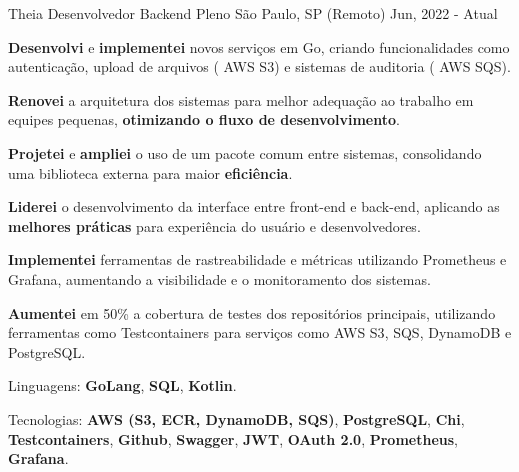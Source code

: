 \begin{cventries}
  \cventry
  {Theia} %
  {Desenvolvedor Backend Pleno} %
  {São Paulo, SP (Remoto)} %
  {Jun, 2022 - Atual} %
  {
    \begin{cvitems}
      \item {\textbf{Desenvolvi} e \textbf{implementei} novos serviços em  {Go}, criando funcionalidades como autenticação, upload de arquivos ( {AWS S3}) e sistemas de auditoria ( {AWS SQS}).}
      \item {\textbf{Renovei} a arquitetura dos sistemas para melhor adequação ao trabalho em equipes pequenas, \textbf{otimizando o fluxo de desenvolvimento}.}
      \item {\textbf{Projetei} e \textbf{ampliei} o uso de um pacote comum entre sistemas, consolidando uma biblioteca externa para maior \textbf{eficiência}.}
      \item {\textbf{Liderei} o desenvolvimento da interface entre front-end e back-end, aplicando as \textbf{melhores práticas} para experiência do usuário e desenvolvedores.}
      \item {\textbf{Implementei} ferramentas de rastreabilidade e métricas utilizando {Prometheus} e {Grafana}, aumentando a visibilidade e o monitoramento dos sistemas.}
      \item {\textbf{Aumentei} em 50\% a cobertura de testes dos repositórios principais, utilizando ferramentas como {Testcontainers} para serviços como {AWS S3}, {SQS}, {DynamoDB} e {PostgreSQL}.}
      \item {Linguagens: \textbf{GoLang}, \textbf{SQL}, \textbf{Kotlin}.}
      \item {Tecnologias: \textbf{AWS (S3, ECR, DynamoDB, SQS)}, \textbf{PostgreSQL}, \textbf{Chi}, \textbf{Testcontainers}, \textbf{Github}, \textbf{Swagger}, \textbf{JWT}, \textbf{OAuth 2.0}, \textbf{Prometheus}, \textbf{Grafana}.}
    \end{cvitems}
  }



\end{cventries}
